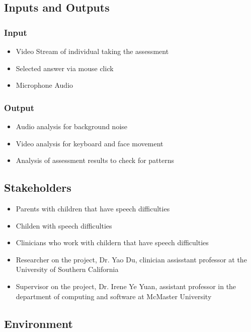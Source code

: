 \documentclass{article}
\begin{document}
\subsection{Inputs and Outputs}
\subsubsection{Input}
\begin{itemize}
\item Video Stream of individual taking the assessment
\item Selected answer via mouse click
\item Microphone Audio 
\end{itemize}
\subsubsection{Output}
\begin{itemize}
\item Audio analysis for background noise 
\item Video analysis for keyboard and face movement
\item Analysis of assessment results to check for patterns
\end{itemize}

\subsection{Stakeholders}
\begin{itemize}
    \item Parents with children that have speech difficulties
    \item Childen with speech difficulties
    \item Clinicians who work with childern that have speech difficulties
    \item Researcher on the project, Dr. Yao Du, clinician assisstant professor at the University of Southern California
    \item Supervisor on the project, Dr. Irene Ye Yuan, assistant professor in the department of computing and software at McMaster University
\end{itemize}

\subsection{Environment}
\end{document}
